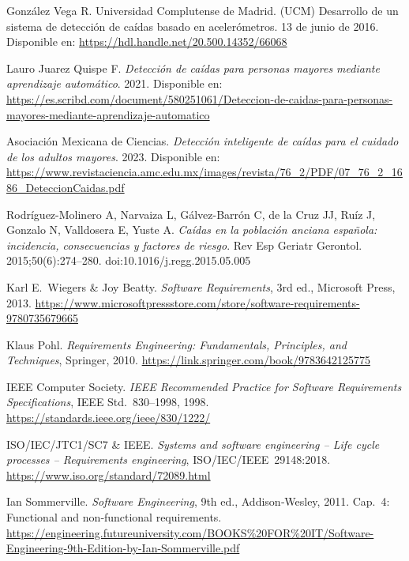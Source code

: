 \documentclass[12pt, a4paper]{article}
\begin{document}
\begin{thebibliography}{9}
	
	González Vega R. Universidad Complutense de Madrid. (UCM) 
	Desarrollo de un sistema de detección de caídas basado en acelerómetros. 13 de junio de 2016.
	Disponible en: \url{https://hdl.handle.net/20.500.14352/66068}
	
	Lauro Juarez Quispe F.
	\textit{Detección de caídas para personas mayores mediante aprendizaje automático}.
	2021.
	Disponible en: \url{https://es.scribd.com/document/580251061/Deteccion-de-caidas-para-personas-mayores-mediante-aprendizaje-automatico}
	
	Asociación Mexicana de Ciencias.
	\textit{Detección inteligente de caídas para el cuidado de los adultos mayores}.
	2023.
	Disponible en: \url{https://www.revistaciencia.amc.edu.mx/images/revista/76_2/PDF/07_76_2_1686_DeteccionCaidas.pdf}
	
	Rodríguez-Molinero A, Narvaiza L, Gálvez-Barrón C, de la Cruz JJ, Ruíz J, Gonzalo N, Valldosera E, Yuste A.
	\textit{Caídas en la población anciana española: incidencia, consecuencias y factores de riesgo}.
	Rev Esp Geriatr Gerontol. 2015;50(6):274–280.
	doi:10.1016/j.regg.2015.05.005
	
	


	Karl E.\ Wiegers \& Joy Beatty.
	\textit{Software Requirements}, 3rd ed.,
	Microsoft Press, 2013.
	\url{https://www.microsoftpressstore.com/store/software-requirements-9780735679665}
	
	Klaus Pohl.
	\textit{Requirements Engineering: Fundamentals, Principles, and Techniques},
	Springer, 2010.
	\url{https://link.springer.com/book/9783642125775}
		
	IEEE Computer Society.
	\textit{IEEE Recommended Practice for Software Requirements Specifications},
	IEEE Std.\ 830--1998, 1998.
	\url{https://standards.ieee.org/ieee/830/1222/}
	
	ISO/IEC/JTC1/SC7 \& IEEE.
	\textit{Systems and software engineering -- Life cycle processes -- Requirements engineering},
	ISO/IEC/IEEE 29148:2018.
	\url{https://www.iso.org/standard/72089.html}
	
	Ian Sommerville.
	\textit{Software Engineering}, 9th ed.,
	Addison‐Wesley, 2011. Cap. 4: Functional and non‐functional requirements.
	\url{https://engineering.futureuniversity.com/BOOKS%20FOR%20IT/Software-Engineering-9th-Edition-by-Ian-Sommerville.pdf}
	


\end{thebibliography}
\end{document}
